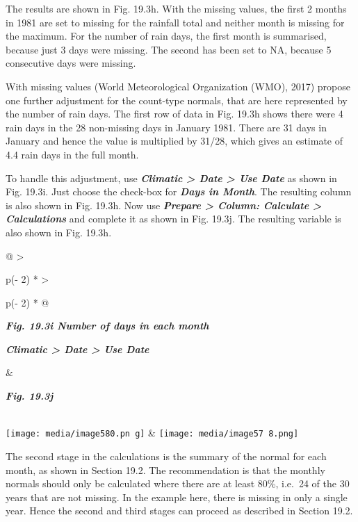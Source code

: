 \documentclass[
  letterpaper,
  DIV=11,
  numbers=noendperiod]{scrreprt}
\begin{document}
The results are shown in Fig. 19.3h. With the missing values, the first
2 months in 1981 are set to missing for the rainfall total and neither
month is missing for the maximum. For the number of rain days, the first
month is summarised, because just 3 days were missing. The second has
been set to NA, because 5 consecutive days were missing.

With missing values (World Meteorological Organization (WMO), 2017)
propose one further adjustment for the count-type normals, that are here
represented by the number of rain days. The first row of data in Fig.
19.3h shows there were 4 rain days in the 28 non-missing days in January
1981. There are 31 days in January and hence the value is multiplied by
31/28, which gives an estimate of 4.4 rain days in the full month.

To handle this adjustment, use \textbf{\emph{Climatic \textgreater{}
Date \textgreater{} Use Date}} as shown in Fig. 19.3i. Just choose the
check-box for \textbf{\emph{Days in Month}}. The resulting column is
also shown in Fig. 19.3h. Now use \textbf{\emph{Prepare \textgreater{}
Column: Calculate \textgreater{} Calculations}} and complete it as shown
in Fig. 19.3j. The resulting variable is also shown in Fig. 19.3h.

\begin{longtable}[]{@{}
  >{\raggedright\arraybackslash}p{(\columnwidth - 2\tabcolsep) * }
  >{\raggedright\arraybackslash}p{(\columnwidth - 2\tabcolsep) * }@{}}
\toprule\noalign{}
\begin{minipage}[b]{\linewidth}\raggedright
\textbf{\emph{Fig. 19.3i Number of days in each month}}

\textbf{\emph{Climatic \textgreater{} Date \textgreater{} Use Date}}
\end{minipage} & \begin{minipage}[b]{\linewidth}\raggedright
\textbf{\emph{Fig. 19.3j}}
\end{minipage} \\
\midrule\noalign{}
\endhead
\bottomrule\noalign{}
\endlastfoot
\texttt{[image: media/image580.pn g]}
&
\texttt{[image: media/image57 8.png]} \\
\end{longtable}

The second stage in the calculations is the summary of the normal for
each month, as shown in Section 19.2. The recommendation is that the
monthly normals should only be calculated where there are at least 80\%,
i.e.~24 of the 30 years that are not missing. In the example here, there
is missing in only a single year. Hence the second and third stages can
proceed as described in Section 19.2.
\end{document}
